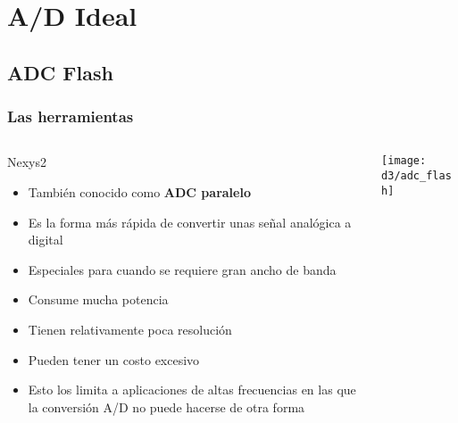 \documentclass{beamer}
\begin{document}
\section{A/D Ideal}
\begin{frame}
  \begin{center}
    \Huge{\color{blue}{Las electrónicas: \\ El firmware de la FPGA}}
  \end{center}
\end{frame}

\subsection{ADC Flash}

\begin{frame}
\frametitle{Las herramientas}
  \begin{columns}
    \begin{column}{0.45\textwidth}
      \begin{block}{Nexys2}
        \begin{itemize}
          \item  También conocido como \textbf{ADC paralelo}
          \item  Es la forma más rápida de convertir unas señal analógica a
digital
          \item  Especiales para cuando se requiere gran ancho de banda 
          \item  Consume mucha potencia
          \item  Tienen relativamente poca resolución
          \item  Pueden tener un costo excesivo
          \item  Esto los limita a aplicaciones de altas frecuencias en las que
la conversión A/D no puede hacerse de otra forma%
        \end{itemize}
      \end{block}
    \end{column} 
    \begin{column}{0.65\textwidth}
      \texttt{[image: d3/adc\_flash]}
    \end{column}
  \end{columns}
\end{frame}
\end{document}
